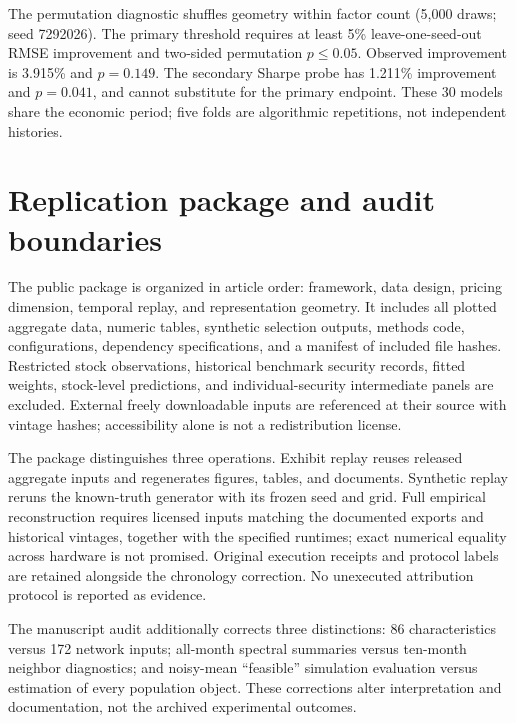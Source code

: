\documentclass[11pt]{article}
\begin{document}
The permutation diagnostic shuffles geometry within factor count (5,000 draws; seed 7292026). The primary threshold requires at least 5\% leave-one-seed-out RMSE improvement and two-sided permutation $p\le0.05$. Observed improvement is 3.915\% and $p=0.149$. The secondary Sharpe probe has 1.211\% improvement and $p=0.041$, and cannot substitute for the primary endpoint. These 30 models share the economic period; five folds are algorithmic repetitions, not independent histories.

\section{Replication package and audit boundaries}
The public package is organized in article order: framework, data design, pricing dimension, temporal replay, and representation geometry. It includes all plotted aggregate data, numeric tables, synthetic selection outputs, methods code, configurations, dependency specifications, and a manifest of included file hashes. Restricted stock observations, historical benchmark security records, fitted weights, stock-level predictions, and individual-security intermediate panels are excluded. External freely downloadable inputs are referenced at their source with vintage hashes; accessibility alone is not a redistribution license.

The package distinguishes three operations. Exhibit replay reuses released aggregate inputs and regenerates figures, tables, and documents. Synthetic replay reruns the known-truth generator with its frozen seed and grid. Full empirical reconstruction requires licensed inputs matching the documented exports and historical vintages, together with the specified runtimes; exact numerical equality across hardware is not promised. Original execution receipts and protocol labels are retained alongside the chronology correction. No unexecuted attribution protocol is reported as evidence.

The manuscript audit additionally corrects three distinctions: 86 characteristics versus 172 network inputs; all-month spectral summaries versus ten-month neighbor diagnostics; and noisy-mean ``feasible'' simulation evaluation versus estimation of every population object. These corrections alter interpretation and documentation, not the archived experimental outcomes.
\end{document}
